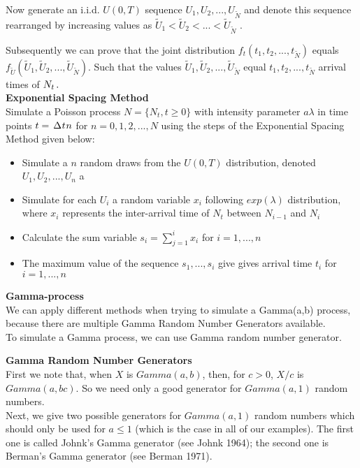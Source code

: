 Now generate an i.i.d. $U(0,T)$ sequence $U_1, U_2, ...,U_{\tilde{N}}$ and denote this sequence rearranged by increasing values as $\tilde{U}_1 < \tilde{U}_2 < ... < \tilde{U}_{\tilde{N}}$ .

Subsequently we can prove that the joint distribution $f_t (t_1, t_2, ...,t_{\tilde{N}})$  equals $f_{\tilde{U}}(\tilde{U}_1, \tilde{U}_2, ...,\tilde{U}_{\tilde{N}})$. Such that the values $\tilde{U}_1, \tilde{U}_2, ...,\tilde{U}_{\tilde{N}}$ equal $t_1, t_2, ...,t_{\tilde{N}} $ arrival times of $N_t \hspace{0.5mm}.$ \\


\textbf{Exponential Spacing Method}\\
Simulate a Poisson process $N=\{N_{t},t\geq 0\}$ with intensity parameter $a\lambda$ in time points $t = \hspace{0.15em} \Delta \hspace{0.05em} t \hspace{0.05em} n$ for $n = 0,1,2,...,N$ using the steps of the Exponential Spacing Method given below:

\begin{flushleft}
\begin{itemize}
            \item  Simulate a $n $ random draws from the $U(0,T)$ distribution, denoted $U_1, U_2, ...,U_n$ a
            \item Simulate for each $U_i$  a random variable $x_i$ following $exp(\lambda)$ distribution, where $x_i$ represents the inter-arrival time of $N_t$ between $N_{i-1}$ and $N_i$
            \item Calculate the sum variable $s_i = \sum_{j=1}^{i} x_i$ for $i=1,...,n$ 
            \item The maximum value of the sequence $s_1,...,s_i$ give gives arrival time $t_i$ for $i = 1,...,n$ 
\end{itemize}
\end{flushleft}


\textbf{Gamma-process}\\
We can apply different methods when trying to simulate a Gamma(a,b) process, because there are multiple Gamma Random Number Generators available.\\

To simulate a Gamma process, we can use Gamma random number generator.

\textbf{Gamma Random Number Generators} \\
First we note that, when $X$ is $Gamma(a,b)$, then, for $c>0$, $X/c$ is $Gamma(a,bc)$. So we need only a good generator for $Gamma(a,1)$ random numbers.\\
Next, we give two possible generators for $Gamma(a,1)$ random numbers which should only be used for $a\leq1$ (which is the case in all of our examples). The first one is called Johnk’s Gamma generator (see Johnk 1964); the second one is Berman’s
Gamma generator (see Berman 1971).\\

